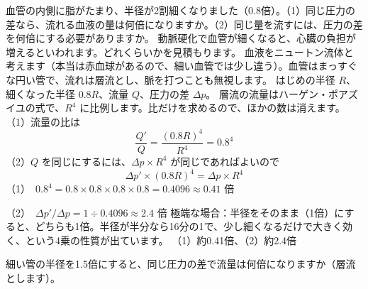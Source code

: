 \begin{phreidai}[細くなった血管]\label{ph:力-14:ex4}
血管の内側に脂がたまり、半径が2割細くなりました（0.8倍）。（1）同じ圧力の差なら、流れる血液の量は何倍になりますか。（2）同じ量を流すには、圧力の差を何倍にする必要がありますか。
\phbamen
動脈硬化で血管が細くなると、心臓の負担が増えるといわれます。どれくらいかを見積もります。
\phmushi
血液をニュートン流体と考えます（本当は赤血球があるので、細い血管では少し違う）。血管はまっすぐな円い管で、流れは層流とし、脈を打つことも無視します。
\phzu
はじめの半径 $R$、細くなった半径 $0.8R$、流量 $Q$、圧力の差 $\Delta p$。
\phriyu
層流の流量はハーゲン・ポアズイユの式で、$R^4$ に比例します。比だけを求めるので、ほかの数は消えます。
\phtateru
（1）流量の比は
\[\frac{Q'}{Q}=\frac{(0.8R)^4}{R^4}=0.8^4\]
（2）$Q$ を同じにするには、$\Delta p\times R^4$ が同じであればよいので
\[\Delta p'\times(0.8R)^4=\Delta p\times R^4\]
\phtoku
（1）\nobreak\ $0.8^4=0.8\times0.8\times0.8\times0.8=0.4096\approx0.41$ 倍\par
（2）\nobreak\ $\Delta p'/\Delta p=1\div 0.4096\approx2.4$ 倍
\phtashikame
極端な場合：半径をそのまま（1倍）にすると、どちらも1倍。半径が半分なら16分の1で、少し細くなるだけで大きく効く、という4乗の性質が出ています。
\kotae （1）約0.41倍、（2）約2.4倍
\end{phreidai}
\begin{jibun}
細い管の半径を1.5倍にすると、同じ圧力の差で流量は何倍になりますか（層流とします）。
\end{jibun}


